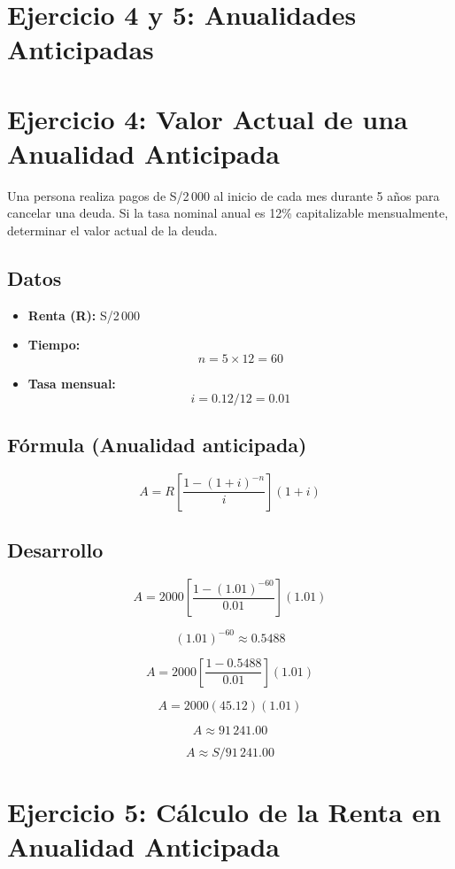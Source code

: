 \documentclass[12pt]{article}
\begin{document}
\section*{Ejercicio 4 y 5: Anualidades Anticipadas}

\section*{Ejercicio 4: Valor Actual de una Anualidad Anticipada}

Una persona realiza pagos de S/2\,000 al inicio de cada mes durante 5 años para cancelar una deuda. Si la tasa nominal anual es 12\% capitalizable mensualmente, determinar el valor actual de la deuda.

\subsection*{Datos}

\begin{itemize}
\item \textbf{Renta (R):} S/2\,000
\item \textbf{Tiempo:}
\[
n = 5 \times 12 = 60
\]
\item \textbf{Tasa mensual:}
\[
i = 0.12/12 = 0.01
\]
\end{itemize}

\subsection*{Fórmula (Anualidad anticipada)}

\[
A = R \left[\frac{1-(1+i)^{-n}}{i}\right](1+i)
\]

\subsection*{Desarrollo}

\[
A = 2000 \left[\frac{1-(1.01)^{-60}}{0.01}\right](1.01)
\]

\[
(1.01)^{-60} \approx 0.5488
\]

\[
A = 2000 \left[\frac{1-0.5488}{0.01}\right](1.01)
\]

\[
A = 2000(45.12)(1.01)
\]

\[
A \approx 91\,241.00
\]

\[
\boxed{A \approx S/91\,241.00}
\]

\section*{Ejercicio 5: Cálculo de la Renta en Anualidad Anticipada}
\end{document}
